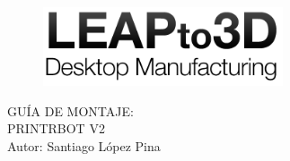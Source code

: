 \begin{center}
	\thispagestyle{empty}
	\begin{figure}[h]
		\centering
		\includegraphics[width=200pt]{./Portada/leap.png}
	\end{figure}
	GUÍA DE MONTAJE:\\
	PRINTRBOT V2\\
	\vspace{300pt}
	Autor: Santiago López Pina\\
\end{center}
